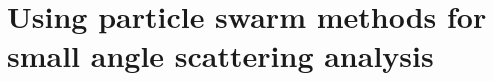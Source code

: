 
\chapter{Using particle swarm methods for small angle scattering analysis} %

\label{smallangle} %




\pagebreak





\renewcommand\bibsection{\section{\refname}}


